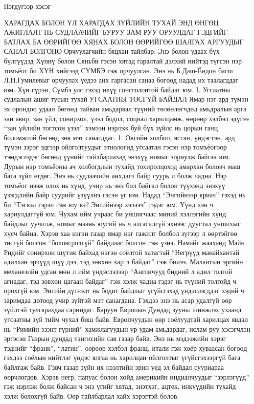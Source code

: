 Нэгдүгээр хэсэг

ХАРАГДАХ БОЛОН ҮЛ ХАРАГДАХ ЗҮЙЛИЙН ТУХАЙ
ЭНД ӨНГӨЦ АЖИГЛАЛТ НЬ СУДЛААЧИЙГ БУРУУ ЗАМ РУУ ОРУУЛДАГ ГЭДГИЙГ БАТЛАХ БА ӨӨРИЙГӨӨ ХЯНАХ БОЛОН ӨӨРИЙГӨӨ ШАЛГАХ АРГУУДЫГ САНАЛ БОЛГОНО
Орчуулагчийн бяцхан тайлбар: Энэ болон удаах бүх бүлгүүдэд Хүннү болон Сяньби гэсэн хятад гаралтай дэлхий нийтэд түгсэн нэр томъёог би ХҮН хийгээд СҮМБЭ гэж орчуулсан. Энэ нь Б.Даш-Ёндон багш Л.Н.Гумилевыг орчуулах үедээ анх гаргасан санаа бөгөөд надад их таалагддаг юм. Хүн гүрэн, Сүмбэ улс гэхэд илүү сонсголонтой байдаг юм.
I. Угсаатны судлалын ашиг тусын тухай
УГСААТНЫ ТӨСГҮЙ БАЙДАЛ
Ямар нэг ард түмэн эх орондоо удаан бөгөөд тайван амьдарвал түүний төлөөлөгчдөд амьдралын арга зан авир, зан үйл, сонирхол, үзэл бодол, социал харилцамж, өөрөөр хэлбэл эдүгээ “зан үйлийн тогтсон үзэл” хэмээн нэрлэж буй бүх зүйлс нь цорын ганц боломжтой бөгөөд зөв мэт санагддаг.
1. Овгийн холбоо, ястан, үндэстэн, ард түмэн зэрэг эдгээр ойлголтуудыг этнологид угсаатан гэсэн нэр томъёогоор тэмдэглэдэг бөгөөд үүнийг тайлбарлахад энэхүү номыг зориулж байгаа юм. Дурын нэр томъёоны ач холбогдлын тухайд тохиролцоход амархан боловч маш бага зүйл өгдөг. Энэ нь судлаачийн анхдагч байр суурь л болж чадна. Нэр томъёог нээж олох нь хүнд, учир нь энэ бол байгал болон түүхэнд энэхүү үзэгдлийн байр суурийг үзүүлнэ гэсэн үг юм. Надад “Энгийнээр яриач” гэхэд нь би “Тэгвэл гэрэл гэж юу вэ? Энгийнээр хэлээч” гэдэг юм. Үүнд хэн ч хариулдаггүй юм. Чухам ийм учраас би уншигчаас миний хэллэгийн хүнд байдлыг уучилж, номыг маань юугий нь ч алгасалгүй эхнээс дуустал уншихыг хүсч байна.
Хэрэв хаа нэгэн газар ямар нэг гажилт болбол зүгээр л өөртэйгөө төсгүй болсон “боловсролгүй” байдлаас болсон гэж үзнэ. Намайг жааханд Майн Ридийг сонирхон шүтэж байхад нэгэн соёлтой хатагтай “Негрүүд манайхантай адилхан эрчүүд шүү дээ, тэд зөвхөн хар л байдаг” гэж билээ. Малаитын эргийн меланезийн удган мөн л ийм үндэслэлээр “Англичууд бидний л адил толгой агнадаг, тэд зөвхөн цагаан байдаг” гэж хэлж чадна гэдэг нь түүний толгойд ч орохгүй юм. Энгийн дүгнэлт нь бодит байдлыг үгүйсгэхэд үндэслэгддэг хэдий ч заримдаа дотоод учир зүйтэй мэт санагдана. Гэхдээ энэ нь асар удалгүй өөр зүйлтэй тулгарахдаа сарнидаг.
Баруун Европын Дундад зууны шинжлэх ухаанд угсаатны зүй тийм чухал биш байв. Европчуудын өөр соёлуудтай харилцах явдал нь “Римийн эзэнт гүрний” хамжлагуудын үр удам амьдардаг, ислам руу хэсэгчлэн эргэсэн Газрын дундад тэнгисийн сав газар байв. Энэ нь мэдээжийн хэрэг тэднийг “франк”, “латин”, өөрөөр хэлбэл франц, итали гэж хоёр хуваасан бөгөөд гэхдээ соёлын нийтлэг үндэс ялгаа нь харилцан ойлголтыг үгүйсгэхээргүй бага байлгаж байв. Гэвч газар зүйн их нээлтийн эрин үед эл байдал сууриараа өөрчлөгдөв. Хэрэв негр, папуас болон хойд америкийн индианчуудыг “зэрлэгүүд” гэж нэрлэж болж байсан ч энэ үгийг хятад, энэтхэг, ацтек, инкүүдийн тухайд хэлж болохгүй байв. Өөр тайлбарлал хайх хэрэгтэй болов.
